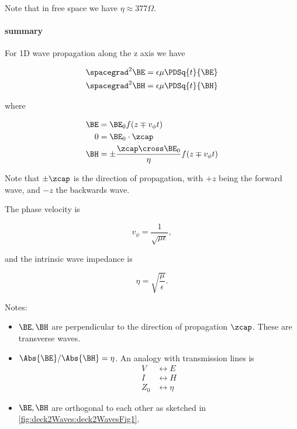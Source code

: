 Note that in free space we have \( \eta \approx 377 \Omega \).

\paragraph{summary}

For 1D wave propagation along the z axis we have

\begin{equation}\label{eqn:uwavesLecture2:580}
\begin{aligned}
\spacegrad^2 \BE &= \epsilon \mu \PDSq{t}{\BE} \\
\spacegrad^2 \BH &= \epsilon \mu \PDSq{t}{\BH} \\
\end{aligned}
\end{equation}

where 

\begin{equation}\label{eqn:uwavesLecture2:600}
\begin{aligned}
\BE &= \BE_0 f( z \mp v_\phi t ) \\
0 &= \BE_0 \cdot \zcap \\
\BH &= \pm \frac{\zcap \cross \BE_0}{\eta} f( z \mp v_\phi t )
\end{aligned}
\end{equation}

Note that \( \pm \zcap \) is the direction of propagation, with \( +z \) being the forward wave, and \( -z \) the backwards wave.

The phase velocity is

\begin{equation}\label{eqn:uwavesLecture2:620}
v_\phi = \frac{1}{\sqrt{\mu\epsilon}},
\end{equation}

and the intrinsic wave impedance is 

\begin{equation}\label{eqn:uwavesLecture2:640}
\eta = \sqrt{\frac{\mu}{\epsilon}}.
\end{equation}

Notes:

\begin{itemize}
\item \( \BE, \BH \) are perpendicular to the direction of propagation \( \zcap \).  These are transverse waves.
\item \( \Abs{\BE}/\Abs{\BH} = \eta \).  An analogy with transmission lines is
\begin{equation}\label{eqn:uwavesLecture2:660}
\begin{aligned}
V &\leftrightarrow E \\
I &\leftrightarrow H \\
Z_0 &\leftrightarrow \eta
\end{aligned}
\end{equation}
\item \( \BE, \BH \) are orthogonal to each other as sketched in \cref{fig:deck2Waves:deck2WavesFig1}.

\end{itemize}

